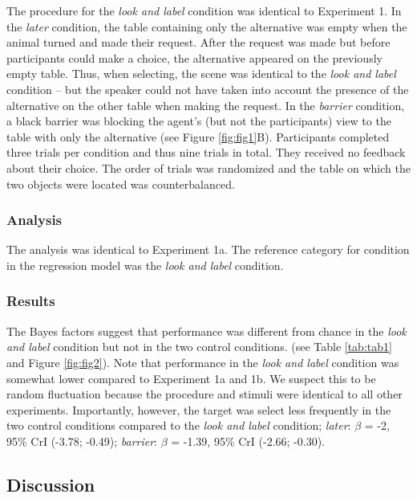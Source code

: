 \documentclass[
  man,floatsintext]{apa6}
\begin{document}
The procedure for the \emph{look and label} condition was identical to Experiment 1. In the \emph{later} condition, the table containing only the alternative was empty when the animal turned and made their request. After the request was made but before participants could make a choice, the alternative appeared on the previously empty table. Thus, when selecting, the scene was identical to the \emph{look and label} condition -- but the speaker could not have taken into account the presence of the alternative on the other table when making the request. In the \emph{barrier} condition, a black barrier was blocking the agent's (but not the participants) view to the table with only the alternative (see Figure \ref{fig:fig1}B). Participants completed three trials per condition and thus nine trials in total. They received no feedback about their choice. The order of trials was randomized and the table on which the two objects were located was counterbalanced.

\subsubsection{Analysis}\label{analysis-2}

The analysis was identical to Experiment 1a. The reference category for condition in the regression model was the \emph{look and label} condition.

\subsubsection{Results}\label{results-2}

The Bayes factors suggest that performance was different from chance in the \emph{look and label} condition but not in the two control conditions. (see Table \ref{tab:tab1} and Figure \ref{fig:fig2}). Note that performance in the \emph{look and label} condition was somewhat lower compared to Experiment 1a and 1b. We suspect this to be random fluctuation because the procedure and stimuli were identical to all other experiments. Importantly, however, the target was select less frequently in the two control conditions compared to the \emph{look and label} condition; \emph{later}: \(\beta\) = -2, 95\% CrI (-3.78; -0.49); \emph{barrier}: \(\beta\) = -1.39, 95\% CrI (-2.66; -0.30).

\subsection{Discussion}\label{discussion-2}
\end{document}
